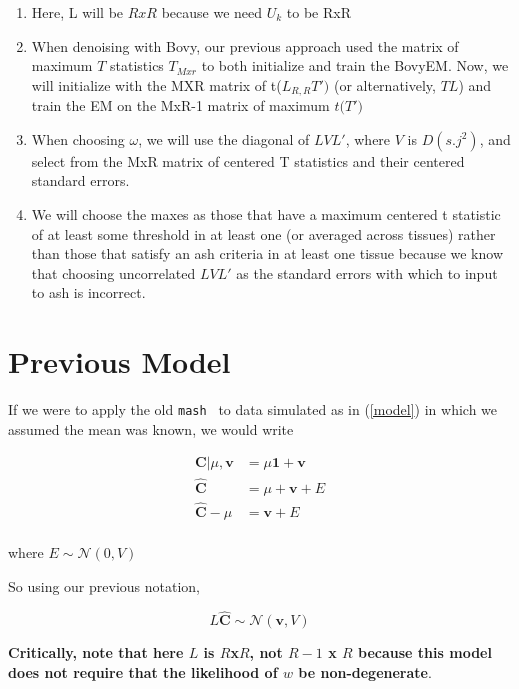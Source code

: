\documentclass[11pt, oneside]{article}   	%
\newcommand{\Norm}{{\mathcal{N}}} %
\newcommand{\ceff}{\bm{C}}
\newcommand{\chat}{\bm{\hat{C}}}
\newcommand{\vb}{\bm{v}}
\def\lstar{\text{ L}}
\def\mash{{\tt mash }}
\begin{document}
{\begin{enumerate}
\item Here, L will be $RxR$ because we need $U_{k}$ to be RxR
\item When denoising with Bovy, our previous approach used the matrix of maximum $T$ statistics $T_{Mxr}$ to both initialize and train the BovyEM. Now, we will initialize with the MXR matrix of t($L_{R,R}T')$ (or alternatively, $TL$) and train the EM on the MxR-1 matrix of maximum $t($\lstar$T')$
\item When choosing $\omega$, we will use the diagonal of $L V L'$, where $V$ is $D(s.j^2)$, and select from the MxR matrix of centered T statistics and their centered standard errors.
\item We will choose the maxes as those that have a maximum centered t statistic of at least some threshold in at least one (or averaged across tissues) rather than those that satisfy an ash criteria in at least one tissue because we know that choosing uncorrelated $L V L'$ as the standard errors with which to input to ash  is incorrect.
\end{enumerate}


\section{Previous Model}

If we were to apply the old \mash{} to data simulated as in (\ref{model}) in which we assumed the mean was known, we would write

\begin{equation}
\label{mashmodel}
\begin{aligned}
\ceff | \mu, \vb  &= \mu \bm{1} + \vb \\
\chat &= \mu + \vb + E \\
\chat - \mu &= \vb + E \\
\end{aligned}
\end{equation}

where $E \sim \Norm (0, V)$

So using our previous notation, 

\begin{equation}
\label{mashlik}
L \chat \sim \Norm(\vb,V)
\end{equation}


\textbf{Critically, note that here $L$ is $R$x$R$, not $R-1$ x $R$ because this model does not require that the likelihood of $w$ be non-degenerate}. 

}
\end{document}
